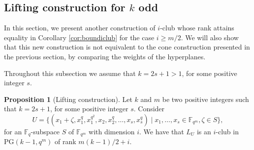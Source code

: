 \documentclass[11pt]{amsart}
\theoremstyle{definition}
\newtheorem{proposition}[theorem]{Proposition}
\newcommand{\fq}{{\mathbb F}_{q}}
\newcommand{\fqm}{\mathbb{F}_{q^m}}
\begin{document}
\subsection{Lifting construction for $k$ odd}


In this section, we present another construction of $i$-club whose rank attains equality in Corollary \ref{cor:boundiclub} for the case $i \geq m/2$.
We will also show that this new construction is not equivalent to the cone construction presented in the previous section, by comparing the weights of the hyperplanes.

Throughout this subsection we assume that $k=2s+1>1$, for some positive integer $s$.

\begin{proposition}[Lifting construction] \label{con:conekodd}
    Let $k$ and $m$ be two positive integers such that $k=2s+1$, for some positive integer $s$.
    Consider
    $$U=\{(x_1+\zeta,x_1^q,x_1^{q^2}, x_2, x_2^{q}, \ldots, x_s,x_s^{q} )\mid x_1,\ldots,x_s\in \mathbb{F}_{q^m}, \zeta\in S\},$$
    for an $\fq$-subspace $S$ of $\fqm$ with dimension $i$. We have that $L_U$ is an $i$-club in $\mathrm{PG}(k-1,q^m)$ of rank $m(k-1)/2+i$.
\end{proposition}
\end{document}
